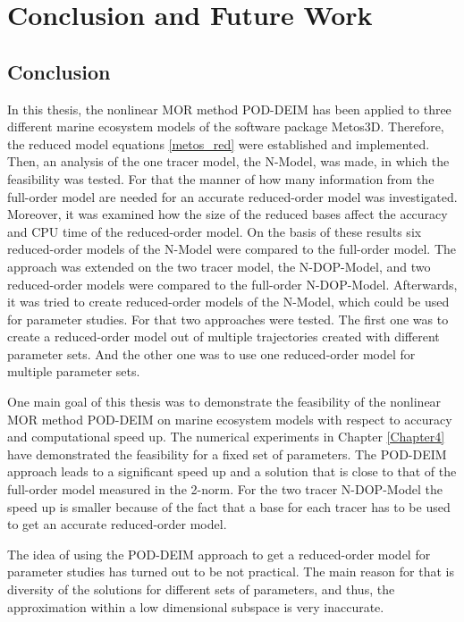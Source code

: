
\chapter{Conclusion and Future Work} %

\label{Chapter6} %


\section{Conclusion}
In this thesis, the nonlinear MOR method POD-DEIM has been applied to three different marine ecosystem models of the software package Metos3D.
Therefore, the reduced model equations \eqref{metos_red} were established and implemented. Then, an analysis of the one
tracer model, the N-Model, was made, in which the feasibility was tested. 
For that the manner of how many information from the full-order model are needed for an accurate reduced-order model was investigated.
Moreover, it was examined how the size of the reduced bases affect the accuracy and CPU time of the reduced-order model.
On the basis of these results six reduced-order models of the N-Model were compared to the full-order model.
The approach was extended on the two tracer model, the N-DOP-Model, and two reduced-order models were compared to the full-order N-DOP-Model.
Afterwards, it was tried to create reduced-order models of the N-Model, which could be used for parameter studies.
For that two approaches were tested. The first one was to create a reduced-order model out of multiple trajectories created with different parameter sets.
And the other one was to use one reduced-order model for multiple parameter sets.


One main goal of this thesis was to demonstrate the feasibility of the nonlinear MOR method POD-DEIM on 
marine ecosystem models with respect to accuracy and computational speed up. The numerical experiments in Chapter \ref{Chapter4}
have demonstrated the feasibility for a fixed set of parameters. The POD-DEIM approach leads to a significant speed up and a solution that is close to that of the full-order model measured in the 2-norm. For the two tracer N-DOP-Model the speed up is smaller because of
the fact that a base for each tracer has to be used to get an accurate reduced-order model.


The idea of using the POD-DEIM approach to get a reduced-order model for parameter studies has turned out to be not practical.
The main reason for that is diversity of the solutions for different sets of parameters, and thus, 
the approximation within a low dimensional subspace is very inaccurate.



